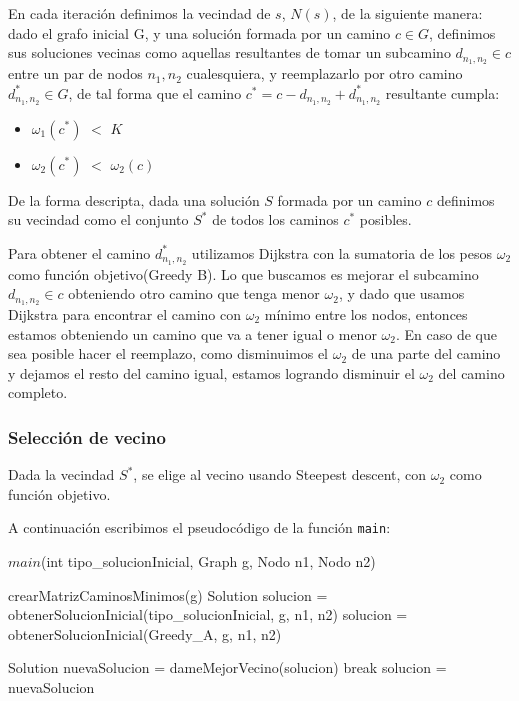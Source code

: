 En cada iteración definimos la vecindad de $s$, $N(s)$, de la siguiente manera: dado el grafo inicial G, y una solución formada por un camino $c \in G$, definimos sus soluciones vecinas como aquellas resultantes de tomar un subcamino $d_{n_1,n_2} \in c$ entre un par de nodos $n_1,n_2$ cualesquiera, y reemplazarlo por otro camino $d_{n_1,n_2}^* \in G$, de tal forma que el camino $c^* = c - d_{n_1,n_2} + d_{n_1,n_2}^*$ resultante cumpla: 

\begin{itemize}
\item $\omega_1(c^*)$ $<$ $K$
\item $\omega_2(c^*)$ $<$ $\omega_2(c)$
\end{itemize}

De la forma descripta, dada una solución $S$ formada por un camino $c$ definimos su vecindad como el conjunto $S^*$ de todos los caminos $c^*$ posibles.

Para obtener el camino $d_{n_1,n_2}^*$ utilizamos Dijkstra con la sumatoria de los pesos $\omega_2$ como función objetivo(Greedy B). Lo que buscamos es mejorar el subcamino $d_{n_1,n_2} \in c$ obteniendo otro camino que tenga menor $\omega_2$, y dado que usamos Dijkstra para encontrar el camino con $\omega_2$ mínimo entre los nodos, entonces estamos obteniendo un camino que va a tener igual o menor $\omega_2$. En caso de que sea posible hacer el reemplazo, como disminuimos el $\omega_2$ de una parte del camino y dejamos el resto del camino igual, estamos logrando disminuir el $\omega_2$ del camino completo.

\subsubsection{Selección de vecino}

Dada la vecindad $S^*$, se elige al vecino usando Steepest descent, con $\omega_2$ como función objetivo.

A continuación escribimos el pseudocódigo de la función \texttt{main}:
\begin{algorithm}[H]
\caption{$main$(int tipo\_solucionInicial, Graph g, Nodo n1, Nodo n2)}
\begin{algorithmic}[1]
  \State crearMatrizCaminosMinimos(g)
  \State Solution solucion = obtenerSolucionInicial(tipo\_solucionInicial, g, n1, n2)
    solucion = obtenerSolucionInicial(Greedy\_A, g, n1, n2)
  \EndIf
  
    	\State Solution nuevaSolucion = dameMejorVecino(solucion)
		\State break	
	\EndIf    
	\State solucion = nuevaSolucion	
    \EndWhile
  \EndIf
\end{algorithmic}
\end{algorithm}

